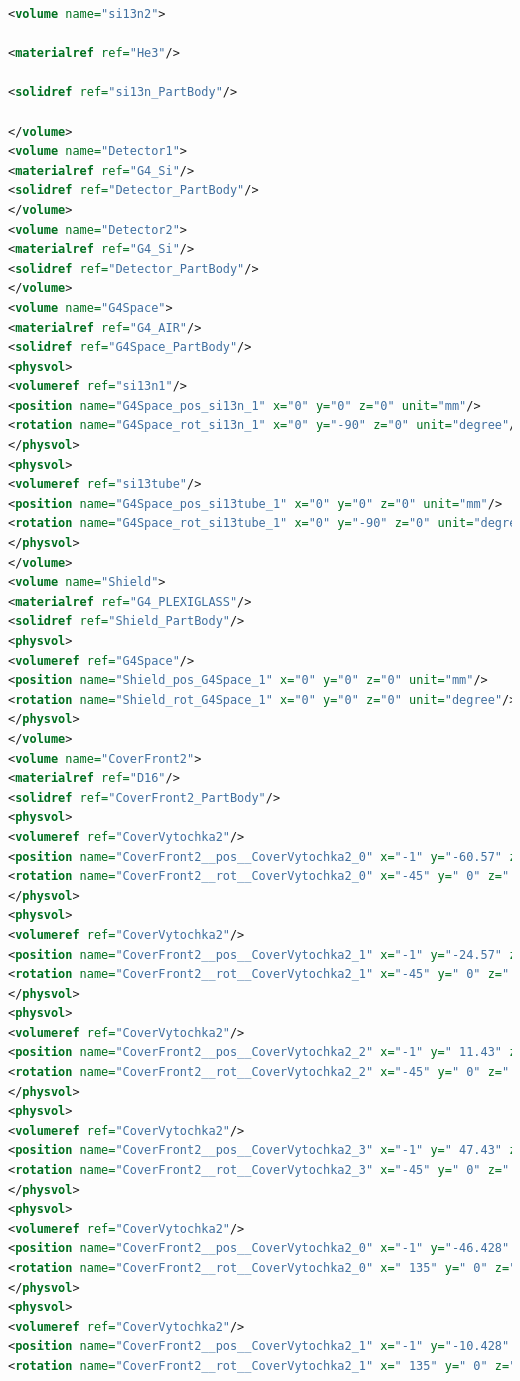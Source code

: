 \begin{lstlisting}[language=XML, firstline=1, lastline=89]
<volume name="si13n2">

<materialref ref="He3"/>

<solidref ref="si13n_PartBody"/>

</volume>
<volume name="Detector1">
<materialref ref="G4_Si"/>
<solidref ref="Detector_PartBody"/>
</volume>
<volume name="Detector2">
<materialref ref="G4_Si"/>
<solidref ref="Detector_PartBody"/>
</volume>
<volume name="G4Space">
<materialref ref="G4_AIR"/>
<solidref ref="G4Space_PartBody"/>
<physvol>
<volumeref ref="si13n1"/>
<position name="G4Space_pos_si13n_1" x="0" y="0" z="0" unit="mm"/>
<rotation name="G4Space_rot_si13n_1" x="0" y="-90" z="0" unit="degree"/>
</physvol>
<physvol>
<volumeref ref="si13tube"/>
<position name="G4Space_pos_si13tube_1" x="0" y="0" z="0" unit="mm"/>
<rotation name="G4Space_rot_si13tube_1" x="0" y="-90" z="0" unit="degree"/>
</physvol>
</volume>
<volume name="Shield">
<materialref ref="G4_PLEXIGLASS"/>
<solidref ref="Shield_PartBody"/>
<physvol>
<volumeref ref="G4Space"/>
<position name="Shield_pos_G4Space_1" x="0" y="0" z="0" unit="mm"/>
<rotation name="Shield_rot_G4Space_1" x="0" y="0" z="0" unit="degree"/>
</physvol>
</volume>
<volume name="CoverFront2">
<materialref ref="D16"/>
<solidref ref="CoverFront2_PartBody"/>
<physvol>
<volumeref ref="CoverVytochka2"/>
<position name="CoverFront2__pos__CoverVytochka2_0" x="-1" y="-60.57" z=" 24" unit="mm"/>
<rotation name="CoverFront2__rot__CoverVytochka2_0" x="-45" y=" 0" z=" 0" unit="deg"/>
</physvol>
<physvol>
<volumeref ref="CoverVytochka2"/>
<position name="CoverFront2__pos__CoverVytochka2_1" x="-1" y="-24.57" z=" 24" unit="mm"/>
<rotation name="CoverFront2__rot__CoverVytochka2_1" x="-45" y=" 0" z=" 0" unit="deg"/>
</physvol>
<physvol>
<volumeref ref="CoverVytochka2"/>
<position name="CoverFront2__pos__CoverVytochka2_2" x="-1" y=" 11.43" z=" 24" unit="mm"/>
<rotation name="CoverFront2__rot__CoverVytochka2_2" x="-45" y=" 0" z=" 0" unit="deg"/>
</physvol>
<physvol>
<volumeref ref="CoverVytochka2"/>
<position name="CoverFront2__pos__CoverVytochka2_3" x="-1" y=" 47.43" z=" 24" unit="mm"/>
<rotation name="CoverFront2__rot__CoverVytochka2_3" x="-45" y=" 0" z=" 0" unit="deg"/>
</physvol>
<physvol>
<volumeref ref="CoverVytochka2"/>
<position name="CoverFront2__pos__CoverVytochka2_0" x="-1" y="-46.428" z=" 8.858" unit="mm"/>
<rotation name="CoverFront2__rot__CoverVytochka2_0" x=" 135" y=" 0" z=" 0" unit="deg"/>
</physvol>
<physvol>
<volumeref ref="CoverVytochka2"/>
<position name="CoverFront2__pos__CoverVytochka2_1" x="-1" y="-10.428" z=" 8.858" unit="mm"/>
<rotation name="CoverFront2__rot__CoverVytochka2_1" x=" 135" y=" 0" z=" 0" unit="deg"/>

\end{lstlisting}

